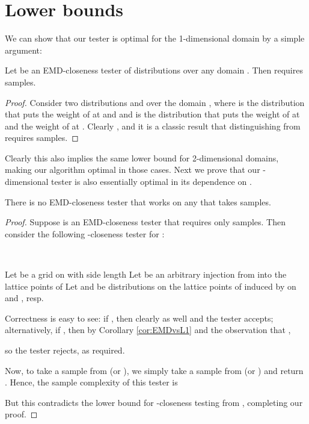 \documentclass[11pt]{article}
\begin{document}
\section{Lower bounds}

We can show that our tester is optimal for the 1-dimensional domain by a simple argument:

\begin{theorem}
 	Let  be an EMD-closeness tester of distributions over any domain .
 	Then  requires  samples.
\end{theorem}

\begin{proof}
Consider two distributions  and  over the domain , where  is the distribution that puts the weight of  at  and  and  is the distribution that puts the weight of  at  and the weight of  at . Clearly , and it is a classic result that distinguishing  from  requires  samples.
\end{proof}

Clearly this also implies the same lower bound for 2-dimensional domains, making our
algorithm optimal in those cases. Next we prove that our -dimensional tester is
also essentially optimal in its dependence on .

\begin{theorem}
	There is no EMD-closeness tester that works on any  that
	takes  samples.
\end{theorem}

\begin{proof}
	Suppose  is an EMD-closeness tester that requires only 
	samples. Then consider the following -closeness tester for :

	\\
	\begin{algorithm}[H]
		Let  be a grid on  with side length \;
		Let  be an arbitrary injection from  into the lattice points of \;
		Let  and  be distributions on the lattice points of  induced by
			 on  and , resp.\;
		\Return{}\;
	\end{algorithm}

	Correctness is easy to see: if , then clearly  as well and the tester
	accepts; alternatively, if , then by Corollary \ref{cor:EMDvsL1}
	and the observation that ,
	
	so the tester rejects, as required.

	Now, to take a sample from  (or ), we simply take a sample
	 from  (or ) and return . Hence, the sample complexity of this
	tester is
	
	But this contradicts the lower bound for -closeness testing from
	\cite{L1tester,valiant}, completing our proof.
\end{proof}
\end{document}
